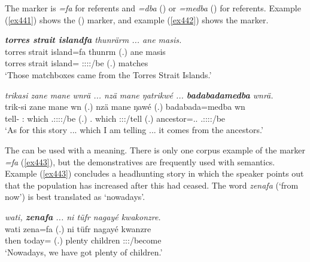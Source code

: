 The   marker is \emph{=fa} for  referents and \emph{=dba} (\Sg) or \emph{=medba} (\Nsg) for  referents. Example (\ref{ex441}) shows the ()   marker, and example (\ref{ex442}) shows the    marker.

\begin{exe}
	\ex \emph{\textbf{torres strait islandfa} thunrärm ... ane masis.}\\
	\gll torres strait island=fa thunrm (.) ane masis\\
	torres strait island={\Abl} \Stpl:\Sbj:\Pst:\Dur:\Venit/be (.) {\Dem} matches\\
	\trans `Those matchboxes came from the Torres Strait Islands.'
	\label{ex441}
\end{exe}
\begin{exe}
	\ex \emph{trikasi zane mane wnrä ... nzä mane ŋatrikwé ... \textbf{badabadamedba} wnrä.}\\
	\gll trik-si zane mane wn (.) nzä mane ŋawé (.) badabada=medba wn\\
	tell-{\Nmlz} \Dem:{\Prox} which \Tsg.\F:\Sbj:\Nonpast:\Ipfv:\Venit/be (.) \Fsg.{\Abs} which \Fsg:\Sbj:\Nonpast:\Ipfv/tell (.) ancestor=\Abl.\Anim.{\Nsg} \Tsg.\F:\Sbj:\Nonpast:\Ipfv:\Venit/be\\
	\trans `As for this story ... which I am telling ... it comes from the ancestors.'\\
	\label{ex442}
\end{exe}

The  can be used with a  meaning. There is only one corpus example of the  marker \emph{=fa} (\ref{ex443}), but the  demonstratives are frequently used with  semantics. Example (\ref{ex443}) concludes a headhunting story in which the speaker points out that the population has increased after this had ceased. The word \emph{zenafa} (`from now') is best translated as `nowadays'.
	
\begin{exe}
	\ex \emph{wati, \textbf{zenafa} ... ni tüfr nagayé kwakonzre.}\\
	\gll wati zena=fa (.) ni tüfr nagayé kwanzre\\
	then today={\Abl} (.) {\Fnsg} plenty children \Fpl:\Sbj:\Rpst:\Ipfv/become\\
	\trans `Nowadays, we have got plenty of children.'
	\label{ex443}
\end{exe}

